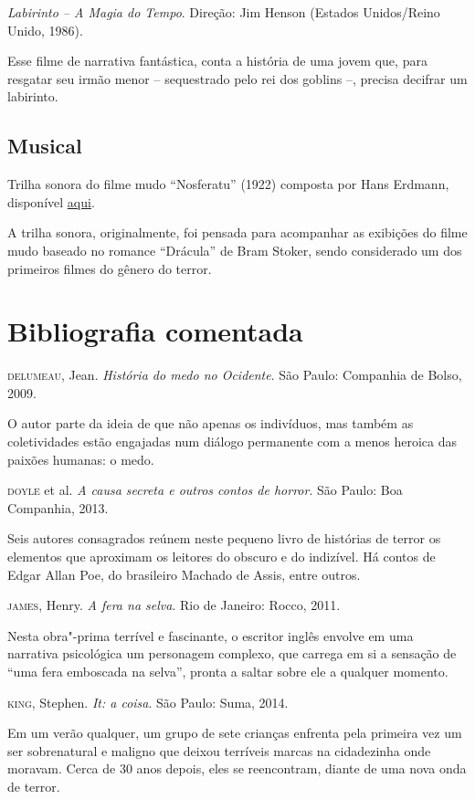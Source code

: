 \documentclass[12pt]{extarticle}
\begin{document}
\textit{Labirinto – A Magia do Tempo}. Direção: Jim Henson (Estados Unidos/Reino Unido, 1986).

Esse filme de narrativa fantástica, conta a história de uma jovem que, para resgatar seu irmão 
menor -- sequestrado pelo rei dos goblins --, precisa decifrar um labirinto.

\subsection{Musical}

Trilha sonora do filme mudo ``Nosferatu'' (1922) composta por Hans Erdmann, disponível \href{https://www.youtube.com/watch?v=NcH38cHjxoM&list=PL8719CBB5D13FFBCA&ab_channel=Billena}{aqui}.

A trilha sonora, originalmente, foi pensada para acompanhar as exibições do filme mudo baseado 
no romance ``Drácula'' de Bram Stoker, sendo considerado um dos primeiros filmes do gênero do 
terror.

\section{Bibliografia comentada}


\textsc{delumeau}, Jean. \textit{História do medo no Ocidente}. São Paulo:
Companhia de Bolso, 2009.

O autor parte da ideia de que não apenas os indivíduos, mas também as
coletividades estão engajadas num diálogo permanente com a menos heroica
das paixões humanas: o medo.

\textsc{doyle} et al. \textit{A causa secreta e outros contos de horror}. São
Paulo: Boa Companhia, 2013.

Seis autores consagrados reúnem neste pequeno livro de histórias de
terror os elementos que aproximam os leitores do obscuro e do indizível.
Há contos de Edgar Allan Poe, do brasileiro Machado de Assis, entre
outros.

\textsc{james}, Henry. \textit{A fera na selva}. Rio de Janeiro: Rocco, 2011.

Nesta obra"-prima terrível e fascinante, o escritor inglês envolve em uma
narrativa psicológica um personagem complexo, que carrega em si a
sensação de ``uma fera emboscada na selva'', pronta a saltar sobre ele a
qualquer momento.

\textsc{king}, Stephen. \textit{It: a coisa}. São Paulo: Suma, 2014.

Em um verão qualquer, um grupo de sete crianças enfrenta pela primeira
vez um ser sobrenatural e maligno que deixou terríveis marcas na
cidadezinha onde moravam. Cerca de 30 anos depois, eles se reencontram,
diante de uma nova onda de terror.
\end{document}
